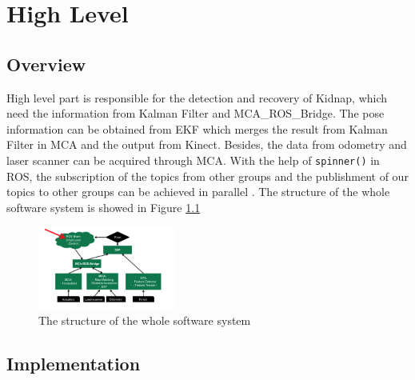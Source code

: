 \chapter{High Level}
\section{Overview}
High level part is responsible for the detection and recovery of Kidnap, which need the information from Kalman Filter and MCA\_ROS\_Bridge. The pose information can be obtained from EKF which merges the result from Kalman Filter in MCA and the output from Kinect. Besides, the data from odometry and laser scanner can be acquired through MCA. With the help of \texttt{spinner()} in ROS, the subscription of the topics from other groups and the publishment of our topics to other groups can be achieved in parallel . The structure of the whole software system is showed in Figure \ref{System}
\begin{figure}[ht]
\centering
\includegraphics[width=0.4\textwidth]{graphics/system.png}
\caption{The structure of the whole software system}
\label{System}
\centering
\end{figure}

\section{Implementation}
